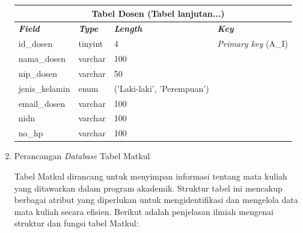 \begin{enumerate}
{\begin{longtable}{l l l l}
				      \multicolumn{4}{c}{\tablename\ \thetable\ {Tabel Dosen} \space (Tabel lanjutan...)}                         \\
				      \hline
				      \textbf{\textit{Field}} & \textbf{\textit{Type}} & \textbf{\textit{Length}}   & \textbf{\textit{Key}}       \\
				      \hline
				      \endhead

				      id\_dosen               & tinyint                & 4                          & \textit{Primary key} (A\_I) \\
				      nama\_dosen             & varchar                & 100                        &                             \\
				      nip\_dosen              & varchar                & 50                         &                             \\
				      jenis\_kelamin          & enum                   & ('Laki-laki', 'Perempuan') &                             \\
				      email\_dosen            & varchar                & 100                        &                             \\
				      nidn                    & varchar                & 100                        &                             \\
				      no\_hp                  & varchar                & 100                        &                             \\
				      \hline
			      \end{longtable}
		      }

	\item Perancangan \textit{Database} Tabel Matkul

	      Tabel Matkul dirancang untuk menyimpan informasi tentang mata kuliah yang ditawarkan dalam program akademik. Struktur tabel ini mencakup berbagai atribut yang diperlukan untuk mengidentifikasi dan mengelola data mata kuliah secara efisien. Berikut adalah penjelasan ilmiah mengenai struktur dan fungsi tabel Matkul:


\end{enumerate}
